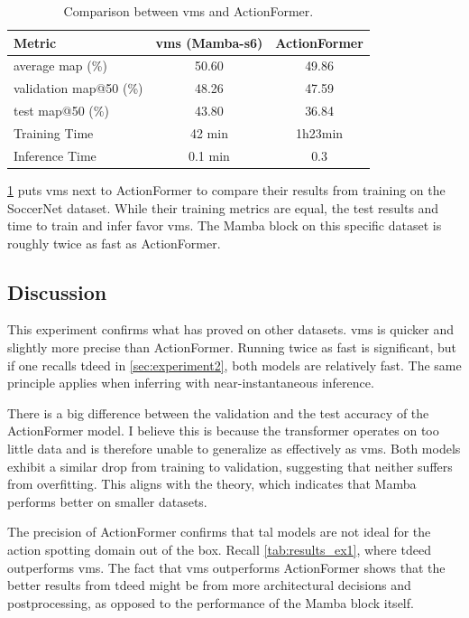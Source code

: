 \begin{table}[ht]
    \centering
    \begin{tabular}{lcc}
        \toprule
        Metric & \acrshort{vms} (Mamba-\acrshort{s6}) & ActionFormer \\
        \midrule
        average \acrshort{map} (\%) & 50.60 & 49.86 \\
        validation \acrshort{map}@50 (\%) & 48.26 & 47.59 \\
        test \acrshort{map}@50 (\%) & 43.80 & 36.84 \\
        Training Time & 42 min & 1h23min \\
        Inference Time & 0.1 min & 0.3 \\
        \bottomrule
    \end{tabular}
    \caption{Comparison between \acrshort{vms} and ActionFormer.}
    \label{tab:results_ex7}
\end{table}

\cref{tab:results_ex7} puts \acrshort{vms} next to ActionFormer to compare their results from training on the SoccerNet dataset. While their training metrics are equal, the test results and time to train and infer favor \acrshort{vms}. The Mamba block on this specific dataset is roughly twice as fast as ActionFormer.


\subsection{Discussion}

This experiment confirms what \textcite{li_videomamba_2024} has proved on other datasets. \acrshort{vms} is quicker and slightly more precise than ActionFormer. Running twice as fast is significant, but if one recalls \acrshort{tdeed} in \cref{sec:experiment2}, both models are relatively fast. The same principle applies when inferring with near-instantaneous inference. 

There is a big difference between the validation and the test accuracy of the ActionFormer model. I believe this is because the transformer operates on too little data and is therefore unable to generalize as effectively as \acrshort{vms}. Both models exhibit a similar drop from training to validation, suggesting that neither suffers from overfitting. This aligns with the theory, which indicates that Mamba performs better on smaller datasets. 

The precision of ActionFormer confirms that \acrfull{tal} models are not ideal for the action spotting domain out of the box. Recall \cref{tab:results_ex1}, where \acrshort{tdeed} outperforms \acrshort{vms}. The fact that \acrshort{vms} outperforms ActionFormer shows that the better results from \acrshort{tdeed} might be from more architectural decisions and postprocessing, as opposed to the performance of the Mamba block itself. 
